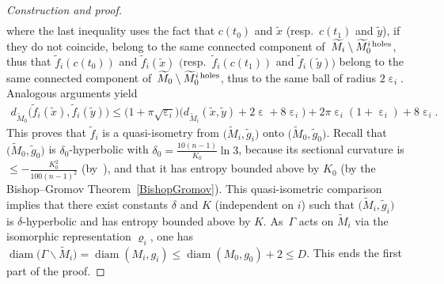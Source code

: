 \documentclass[10pt,a4paper]{amsart}
\numberwithin{equation}{section}
\newcommand{\diam}{\operatorname{diam}}
\newcommand{\e}{\operatorname{\varepsilon}}
\begin{document}
\begin{proof}[Construction and proof]
\begin{gather*}
\end{gather*}
where the last inequality uses the fact that $c(t_0)$ and $\tilde x$ (resp.\ $c(t_1)$ and $\tilde y$), if they do not coincide, belong to the same
connected
component of~$ \widetilde M_i \setminus \widetilde M_0^{i {\rm \, holes}}$, thus that $\tilde f_i (c(t_0))$ and $\tilde f_i (\tilde x)$ $\big($resp.\ $\tilde f_i (c(t_1))$
and $\tilde f_i (\tilde y)\big)$ belong to the same connected component of~$ \widetilde M_0 \setminus \widetilde M_0^{i {\rm \, holes}}$, thus to the same ball
of radius $2 \e_i$. Analogous arguments yield
\begin{gather*}
d_{\widetilde M_0}\big(\tilde f_i(\tilde x),\tilde f_i (\tilde y)\big) \le \big(1+ \pi\sqrt{\e_i}\big) \big(d_{\widetilde M_i } (\tilde x,\tilde y) + 2 \e + 8 \e_i \big) + 2 \pi \e_i (1 + \e_i) + 8 \e_i.
\end{gather*}
This proves that $\tilde f_i $ is a quasi-isometry from $\big(\widetilde M_i, \tilde g_i\big)$ onto $\big(\widetilde M_0, \tilde g_0\big)$. Recall that $\big(\widetilde M_0, \tilde g_0\big)$ is
$\delta_0$-hyperbolic with $\delta_0 = \frac{10 (n-1)}{K_0} \ln 3 $, because its sectional curvature is $\le - \frac{K_0^2}{100 (n-1)^2}$ (by~\cite[Proposition~1.4.3, p.~12]{CDP}), and that it has entropy bounded
above by $K_0$ (by the Bishop--Gromov Theorem~\ref{BishopGromov}). This quasi-isometric comparison implies that
there exist constants $\delta$ and $K$ (independent on $i$) such that $\big(\widetilde M_i, \tilde g_i\big)$ is $\delta$-hyperbolic and has entropy bounded
above by $K$. As~$\Gamma$ acts on $\widetilde M_i$ via the isomorphic representation $\varrho_i$, one has
$\diam \big(\Gamma \backslash \widetilde M_i\big) = \diam (M_i,g_i) \le \diam (M_0, g_0) + 2 \le D $. This ends the first part of the proof.

\medskip


\end{proof}
\end{document}
